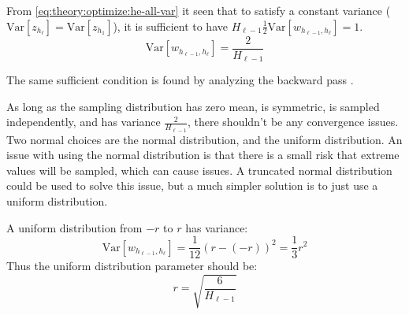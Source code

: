 From \eqref{eq:theory:optimize:he-all-var} it seen that to satisfy a constant variance ($\mathrm{Var}[z_{h_\ell}] = \mathrm{Var}[z_{h_1}]$), it is sufficient to have ${H_{\ell-1} \frac{1}{2} \mathrm{Var}[w_{h_{\ell-1}, h_{\ell}}] = 1}$.
\begin{equation}
\mathrm{Var}[w_{h_{\ell-1}, h_{\ell}}] = \frac{2}{H_{\ell-1}}
\end{equation}

The same sufficient condition is found by analyzing the backward pass \cite{he-initialization}.

As long as the sampling distribution has zero mean, is symmetric, is sampled independently, and has variance $\frac{2}{H_{\ell-1}}$, there shouldn't be any convergence issues. Two normal choices are the normal distribution, and the uniform distribution. An issue with using the normal distribution is that there is a small risk that extreme values will be sampled, which can cause issues. A truncated normal distribution could be used to solve this issue, but a much simpler solution is to just use a uniform distribution.

A uniform distribution from $-r$ to $r$ has variance:
\begin{equation}
\mathrm{Var}[w_{h_{\ell-1}, h_{\ell}}] = \frac{1}{12} (r - (-r))^2 = \frac{1}{3} r^2
\end{equation}
Thus the uniform distribution parameter should be:
\begin{equation}
r = \sqrt{\frac{6}{H_{\ell-1}}}
\end{equation}

